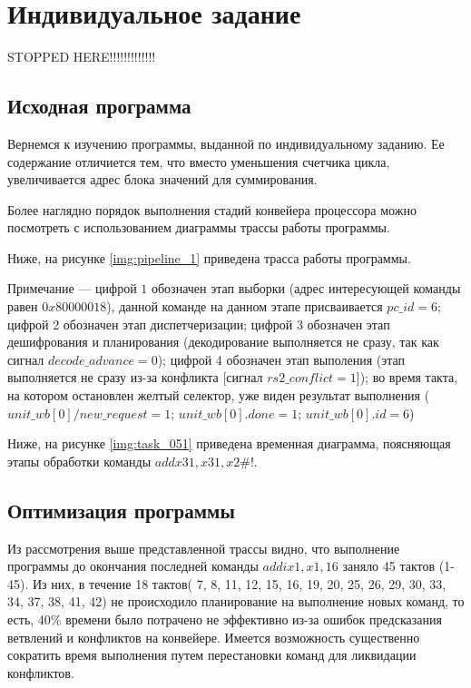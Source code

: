 \chapter{Индивидуальное задание}
\label{cha:research}

STOPPED HERE!!!!!!!!!!!!!

\section{Исходная программа}

Вернемся к изучению программы, выданной по индивидуальному заданию. Ее содержание отличиется тем, что вместо уменьшения счетчика цикла, увеличивается адрес блока значений для суммирования. 

Более наглядно порядок выполнения стадий конвейера процессора можно посмотреть с использованием диаграммы трассы работы программы.

Ниже, на рисунке \ref{img:pipeline_1} приведена трасса работы программы.


Примечание --- цифрой $1$ обозначен этап выборки (адрес интересующей команды равен $0x80000018$), данной команде на данном этапе присваивается $pc\_id = 6$; цифрой 2 обозначен этап диспетчеризации; цифрой 3 обозначен этап дешифрования и планирования (декодирование выполняется не сразу, так как сигнал $decode\_advance = 0$); цифрой 4 обозначен этап выполения (этап выполняется не сразу из-за конфликта [сигнал $rs2\_conflict = 1$]); во время такта, на котором остановлен желтый селектор, уже виден результат выполнения ($unit\_wb[0]/new\_request = 1$; $unit\_wb[0].done = 1$; $unit\_wb[0].id = 6$)

Ниже, на рисунке \ref{img:task_051} приведена временная диаграмма, поясняющая этапы обработки команды $add x31, x31, x2 \#!$.


\section{Оптимизация программы}

Из рассмотрения выше представленной трассы видно, что выполнение программы до окончания последней команды $addi x1, x1, 16$ заняло 45 тактов (1-45). Из них, в течение 18 тактов(
7, 8, 11, 12, 15, 16, 19, 20, 25, 26, 29, 30, 33, 34, 37, 38, 41, 42) не происходило планирование на выполнение новых команд, то есть, 40\% времени было потрачено не эффективно из-за ошибок предсказания ветвлений и конфликтов на конвейере. Имеется возможность существенно сократить время выполнения путем перестановки команд для ликвидации конфликтов. 

